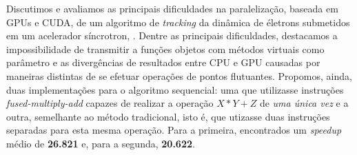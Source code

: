 \documentclass[12pt]{article}
\begin{document}
Discutimos e avaliamos as principais dificuldades na paralelização, baseada em
GPUs e CUDA, de um algoritmo de \textit{tracking} da dinâmica de életrons
submetidos em um acelerador síncrotron, . Dentre as principais
dificuldades, destacamos a impossibilidade de transmitir a funções
 objetos com métodos virtuais como parâmetro \cite{virtual} e
as divergências de resultados entre CPU e GPU causadas por maneiras distintas de
se efetuar operações de pontos flutuantes. Propomos, ainda, duas implementações
para o algoritmo sequencial: uma que utilizasse instruções
\textit{fused-multiply-add} capazes de realizar a operação \(X*Y + Z\) de
\textit{uma única vez} e a outra, semelhante ao método tradicional, isto é, que
utizasse duas instruções separadas para esta mesma operação. Para a primeira,
encontrados um \textit{speedup} médio de \textbf{26.821} e, para a segunda,
\textbf{20.622}.



\end{document}
